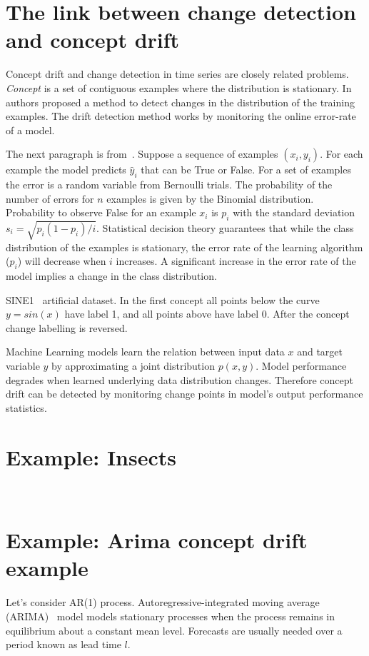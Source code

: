 \documentclass[doctoral,utf8,lot,loar,lof,shortloft,index]{jydiss}
\begin{document}
\section{The link between change detection and concept drift}

Concept drift and change detection in time series are closely related problems.
\textit{Concept} is a set of contiguous examples where the distribution is stationary.
In~\cite{gama2004learning} authors proposed a method to detect changes in the distribution of the training examples.
The drift detection method works by monitoring the online error-rate of a model.

The next paragraph is from~\cite{gama2004learning}.
Suppose a sequence of examples $(x_i, y_i)$.
For each example the model predicts $\hat y_i$ that can be True or False.
For a set of examples the error is a random variable from Bernoulli trials.
The probability of the number of errors for $n$ examples is given by the Binomial distribution.
Probability to observe False for an example $x_i$ is $p_i$ with the standard deviation $s_i=\sqrt{p_i(1-p_i)/i}$.
Statistical decision theory guarantees that while the class distribution of the examples is stationary, the error rate of the learning algorithm ($p_i$) will decrease when $i$ increases.
A significant increase in the error rate of the model implies a change in the class distribution.

SINE1~\cite{gama2004learning} artificial dataset.
In the first concept all points below the curve $y=sin(x)$ have label 1, and all points above have label 0.
After the concept change labelling is reversed.

Machine Learning models learn the relation between input data $x$ and target
variable $y$ by approximating a joint distribution $p(x,y)$.  Model performance
degrades when learned underlying data distribution changes.  Therefore concept
drift can be detected by monitoring change points in model's output performance
statistics.

\section{Example: Insects}
~\cite{SouzaChallenges2020}


\section{Example: Arima concept drift example}
Let's consider AR(1) process.
Autoregressive-integrated moving average (ARIMA)~\cite{box2015time} model models stationary processes when the process remains in equilibrium about a constant mean level.
Forecasts are usually needed over a period known as lead time $l$.
\end{document}
